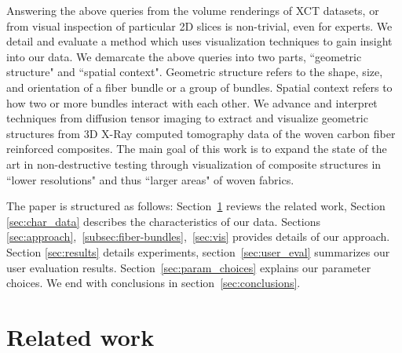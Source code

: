 Answering the above queries from the volume renderings of XCT datasets, or from visual inspection of particular 2D slices is non-trivial, even for experts. We detail and evaluate a method which uses visualization techniques to gain insight into our data. We demarcate the above queries into two parts, ``geometric structure" and ``spatial context". Geometric structure refers to the shape, size, and orientation of a fiber bundle or a group of bundles. Spatial context refers to how two or more bundles interact with each other. 
We advance and interpret techniques from diffusion tensor imaging to extract and visualize geometric structures from 3D X-Ray computed tomography data of the woven carbon fiber reinforced composites. The main goal of this work is to expand the state of the art in non-destructive testing through visualization of composite structures in ``lower resolutions" and thus ``larger areas" of woven fabrics.

The paper is structured as follows: Section~\ref{sec:prev_work} reviews the related work,  Section \ref{sec:char_data} describes the   characteristics of our data. Sections \ref{sec:approach},~\ref{subsec:fiber-bundles},~\ref{sec:vis} provides details of our approach. Section \ref{sec:results} details experiments, section~\ref{sec:user_eval} summarizes our user evaluation results. Section~\ref{sec:param_choices} explains our  parameter choices. We end with conclusions in section~\ref{sec:conclusions}.



\section {Related work}
\label{sec:prev_work}

